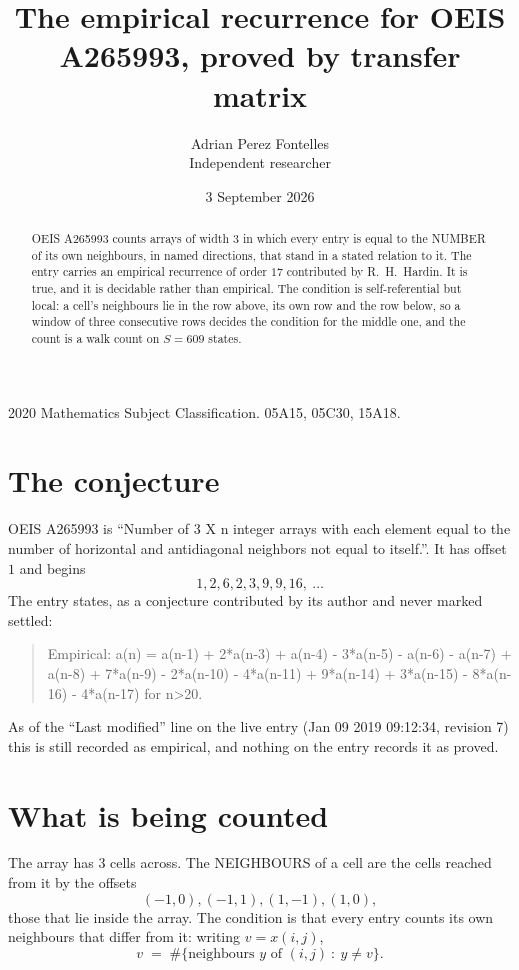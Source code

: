 \documentclass[11pt,a4paper]{article}
\title{The empirical recurrence for OEIS A265993, proved by transfer matrix}
\author{Adrian Perez Fontelles\\ \small Independent researcher}
\date{3 September 2026}
\theoremstyle{plain}
\theoremstyle{definition}
\begin{document}
\maketitle

\begin{abstract}
OEIS A265993 counts arrays of width $3$ in which every entry is equal to the NUMBER of its own
neighbours, in named directions, that stand in a stated relation to it. The entry carries an
empirical recurrence of order $17$ contributed by R.~H.~Hardin. It is true, and it is
decidable rather than empirical. The condition is self-referential but local: a cell's
neighbours lie in the row above, its own row and the row below, so a window of three
consecutive rows decides the condition for the middle one, and the count is a walk count on
$S=609$ states.
\end{abstract}

\noindent\small 2020 Mathematics Subject Classification. 05A15, 05C30, 15A18.\normalsize

\section{The conjecture}

OEIS A265993 is ``Number of 3 X n integer arrays with each element equal to the number of horizontal and antidiagonal neighbors not equal to itself.''. It has offset $1$ and begins
\[
1, 2, 6, 2, 3, 9, 9, 16,\ \dots
\]
The entry states, as a conjecture contributed by its author and never marked settled:
\begin{quote}
Empirical: a(n) = a(n-1) + 2*a(n-3) + a(n-4) - 3*a(n-5) - a(n-6) - a(n-7) + a(n-8) + 7*a(n-9) - 2*a(n-10) - 4*a(n-11) + 9*a(n-14) + 3*a(n-15) - 8*a(n-16) - 4*a(n-17) for n>20.
\end{quote}
As of the ``Last modified'' line on the live entry (Jan 09 2019 09:12:34, revision 7) this is still
recorded as empirical, and nothing on the entry records it as proved.

\section{What is being counted}

The array has $3$ cells across. The NEIGHBOURS of a cell are the cells reached from it by the
offsets
\[
(-1,0), (-1,1), (1,-1), (1,0),
\]
those that lie inside the array. The condition is that every entry counts its own neighbours
that differ from it: writing $v=x(i,j)$,
\[
v\;=\;\#\{\text{neighbours } y \text{ of } (i,j)\ :\ y\ne v\} .
\]
\end{document}
